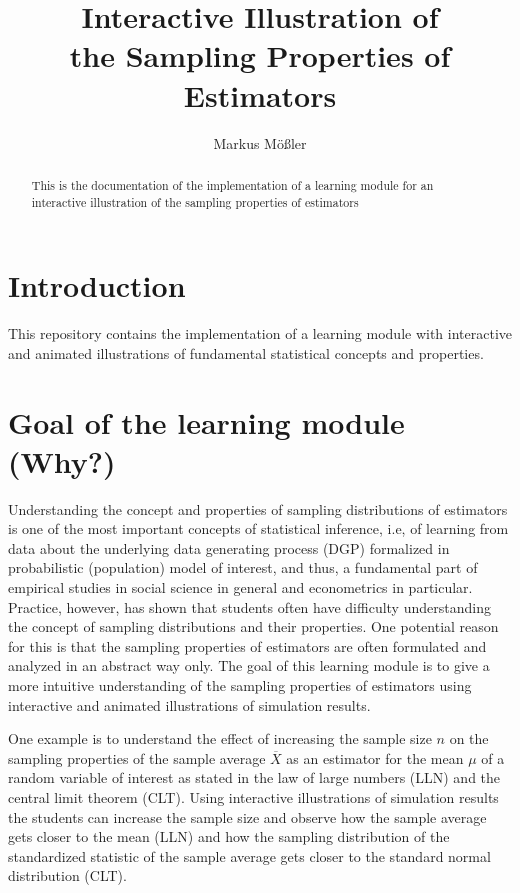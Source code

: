 \documentclass{article}
\title{Interactive Illustration of \\ the Sampling Properties of \\ Estimators}
\author{Markus M\"o\ss ler}
\begin{document}
	
\maketitle
	
\begin{abstract}
This is the documentation of the implementation of a learning module for an interactive illustration of the sampling properties of estimators
\end{abstract}

\section{Introduction}

This repository contains the implementation of a learning module with interactive and animated illustrations of fundamental statistical concepts and properties.

\section{Goal of the learning module (Why?)}

Understanding the concept and properties of sampling distributions of estimators is one of the most important concepts of statistical inference, i.e, of learning from data about the underlying data generating process (DGP) formalized in probabilistic (population) model of interest, and thus, a fundamental part of empirical studies in social science in general and econometrics in particular. 
%
Practice, however, has shown that students often have difficulty understanding the concept of sampling distributions and their properties. 
%
One potential reason for this is that the sampling properties of estimators are often formulated and analyzed in an abstract way only. 
%
The goal of this learning module is to give a more intuitive understanding of the sampling properties of estimators using interactive and animated illustrations of simulation results. 

One example is to understand the effect of increasing the sample size $n$ on the sampling properties of the sample average $\overline{X}$ as an estimator for the mean $\mu$ of a random variable of interest as stated in the law of large numbers (LLN) and the central limit theorem (CLT). 
%
Using interactive illustrations of simulation results the students can increase the sample size and observe how the sample average gets closer to the mean (LLN) and how the sampling distribution of the standardized statistic of the sample average gets closer to the standard normal distribution (CLT). 
\end{document}
